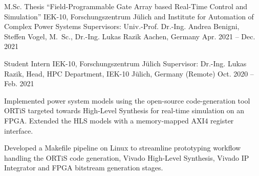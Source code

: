
\begin{cvexperience}

\cvposition
	{M.Sc. Thesis ``Field-Programmable Gate Array based Real-Time Control and Simulation''} %
	{IEK-10, Forschungszentrum J\"ulich and Institute for Automation of Complex Power Systems} %
	{Supervisors: Univ.-Prof. Dr.-Ing. Andrea Benigni, Steffen Vogel, M.\, Sc., Dr.-Ing. Lukas Razik} %
	{Aachen, Germany} %
	{Apr. 2021 -- Dec. 2021} %
	{\begin{cvitems}
		\item {}
	\end{cvitems}}

\cvposition
	{Student Intern} %
	{IEK-10, Forschungszentrum J\"ulich} %
	{Supervisor: Dr.-Ing. Lukas Razik, Head, HPC Department, IEK-10} %
	{J\"ulich, Germany (Remote)} %
	{Oct. 2020 -- Feb. 2021} %
	{\begin{cvitems}
		\item {Implemented power system models using the open-source code-generation tool ORTiS targeted towards High-Level Synthesis for real-time simulation on an FPGA. Extended the HLS models with a memory-mapped AXI4 register interface.}
  		\item {Developed a Makefile pipeline on Linux to streamline prototyping workflow handling the ORTiS code generation, Vivado High-Level Synthesis, Vivado IP Integrator and FPGA bitstream generation stages.}
	\end{cvitems}}


\end{cvexperience}
